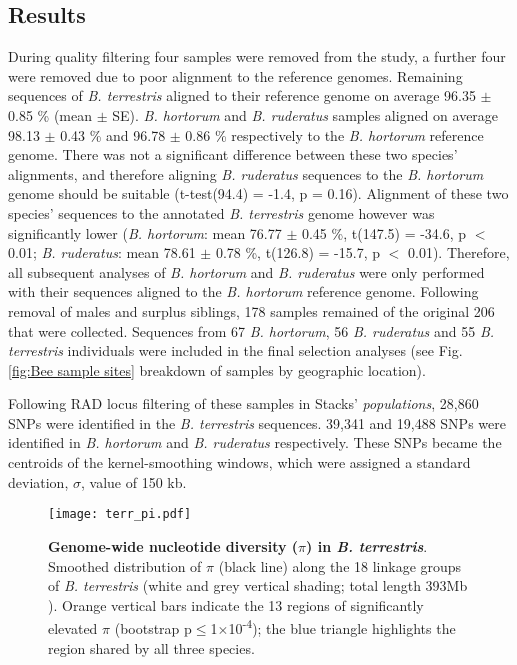 \documentclass[12pt]{article}
\begin{document}
\begin{linenumbers}
      
    \section{Results}
    
    

	During quality filtering four samples were removed from the study, a further four were removed due to poor alignment to the reference genomes. Remaining sequences of \emph{B. terrestris} aligned to their reference genome on average 96.35 $\pm$ 0.85 \% (mean $\pm$ SE). \emph{B. hortorum} and \emph{B. ruderatus} samples aligned on average 98.13 $\pm$ 0.43 \% and 96.78 $\pm$ 0.86 \% respectively to the \emph{B. hortorum} reference genome. There was not a significant difference between these two species' alignments, and therefore aligning \emph{B. ruderatus} sequences to the \emph{B. hortorum} genome should be suitable (t-test(94.4) = -1.4, p = 0.16). Alignment of these two species' sequences to the annotated \emph{B. terrestris} genome however was significantly lower (\emph{B. hortorum}: mean 76.77 $\pm$ 0.45 \%, t(147.5) = -34.6, p $<$ 0.01; \emph{B. ruderatus}: mean 78.61 $\pm$ 0.78 \%, t(126.8) = -15.7, p $<$ 0.01). Therefore, all subsequent analyses of \emph{B. hortorum} and \emph{B. ruderatus} were only performed with their sequences aligned to the \emph{B. hortorum} reference genome. Following removal of males and surplus siblings, 178 samples remained of the original 206 that were collected. Sequences from 67 \emph{B. hortorum}, 56 \emph{B. ruderatus} and 55 \emph{B. terrestris} individuals were included in the final selection analyses (see Fig. \ref{fig:Bee sample sites} breakdown of samples by geographic location). 
    	
	Following RAD locus filtering of these samples in Stacks' \emph{populations}, 28,860 SNPs were identified in the \emph{B. terrestris} sequences. 39,341 and 19,488 SNPs were identified in \emph{B. hortorum} and \emph{B. ruderatus} respectively. These SNPs became the centroids of the kernel-smoothing windows, which were assigned a standard deviation, $\sigma$, value of 150 kb.
  		
  	\begin{figure}[ht!]
  			\centering
  			\texttt{[image: terr\_pi.pdf]}
  			\captionsetup{width=0.88\linewidth}
  			\caption{\textbf{Genome-wide nucleotide diversity ($\pi$) in \emph{B. terrestris}}. Smoothed distribution of $\pi$ (black line) along the 18 linkage groups of \emph{B. terrestris} (white and grey vertical shading; total length 393Mb  \citep{ncbi_iybomterr12_2022}). Orange vertical bars indicate the 13 regions of significantly elevated $\pi$ (bootstrap p$\leq$1$\times$10\textsuperscript{-4}); the blue triangle highlights the region shared by all three species.}
  			\label{fig:terr_pi}
  	\end{figure}
  	

\end{linenumbers}
\end{document}
